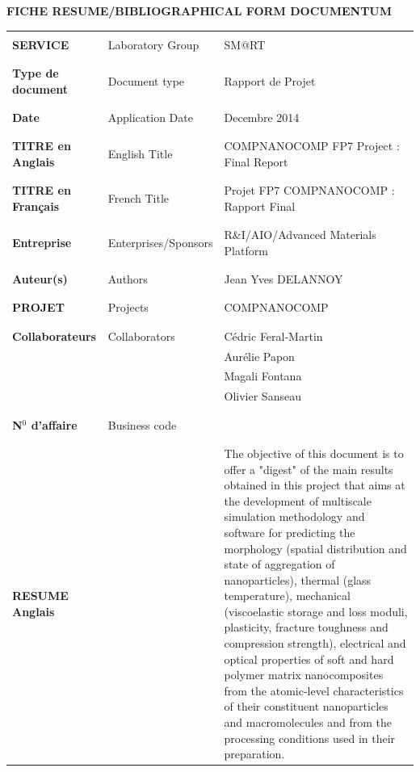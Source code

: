\documentclass[10pt, letter]{report}
\renewcommand{\=}{\, =\, }
\newcommand{\+}{\, +\, }
\renewcommand{\-}{\, -\, }
\begin{document}
\newpage
\begin{center}
{\bf FICHE RESUME/BIBLIOGRAPHICAL FORM DOCUMENTUM}
\end{center}
\begin{flushleft}
\begin{tabular}{|l|p{}|p{}|}
\hline
&&\\
{\bf SERVICE} & Laboratory Group & SM@RT\\
&&\\ \hline &&\\
{\bf Type de document} & Document type & Rapport de Projet \\
&&\\ \hline &&\\
\bf Date & Application Date & Decembre 2014\\
&&\\ \hline &&\\
{\bf TITRE en Anglais} & English Title & COMPNANOCOMP FP7 Project : Final Report \\
&&\\ \hline &&\\
{\bf TITRE en Français} & French Title & Projet FP7 COMPNANOCOMP : Rapport Final \\
&&\\ \hline &&\\
\bf Entreprise & Enterprises/Sponsors & R$\&$I/AIO/Advanced Materials Platform  \\
&&\\ \hline &&\\
\bf Auteur(s) & Authors & Jean Yves DELANNOY \\
&&\\ \hline &&\\
\bf PROJET & Projects & COMPNANOCOMP\\
&&\\ \hline &&\\
\bf Collaborateurs & Collaborators & Cédric Feral-Martin\\
&& Aur\'elie Papon\\
&& Magali Fontana\\
&& Olivier Sanseau \\
&&\\ \hline &&\\
\bf N$^0$ d'affaire & Business code & \\
&&\\ \hline &&\\

\bf RESUME  Anglais & & The objective of this document is to offer a "digest" of the main results obtained  in this project that aims at the development of multiscale simulation methodology and software for predicting the morphology (spatial distribution and state of aggregation of nanoparticles), thermal (glass temperature), mechanical (viscoelastic storage and loss moduli, plasticity, fracture toughness and compression strength), electrical and optical properties of soft and hard polymer matrix nanocomposites from the atomic-level characteristics of their constituent nanoparticles and macromolecules and from the processing conditions used in their preparation.


\end{tabular}
\end{flushleft}
\end{document}
